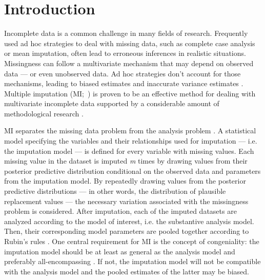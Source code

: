 \documentclass[3p,12pt,a4paper]{elsarticle}
\begin{document}
\newpage
\tableofcontents
\newpage
\section{Introduction}
Incomplete data is a common challenge in many fields of research. Frequently used ad hoc strategies to deal with missing data, such as complete case analysis or mean imputation, often lead to erroneous inferences in realistic situations. Missingness can follow a multivariate mechanism that may depend on observed data --- or even unobserved data. Ad hoc strategies don't account for those mechanisms, leading to biased estimates and inaccurate variance estimates \citep{buurenFlexibleImputationMissing2018, kang2013, enders2017, austin2021, little2002}. Multiple imputation (MI;~) is proven to be an effective method for dealing with multivariate incomplete data supported by a considerable amount of methodological research \citep{mistlerComparisonJointModel2017, buurenFlexibleImputationMissing2018, enders2017, burgette2010, austin2021, audigier2018, vanbuuren2007, grund2021, hughes2014, little2002}.

MI separates the missing data problem from the analysis problem \citep{mistlerComparisonJointModel2017, buurenFlexibleImputationMissing2018, enders2017, burgette2010, austin2021, audigier2018, vanbuuren2007, grund2021, hughes2014, little2002, carpenter2013, bartlett2015}. A statistical model specifying the variables and their relationships used for imputation --- i.e. the imputation model --- is defined for every variable with missing values. Each missing value in the dataset is imputed \textit{m} times by drawing values from their posterior predictive distribution conditional on the observed data and parameters from the imputation model. By repeatedly drawing values from the posterior predictive distributions --- in other words, the distribution of plausible replacement values --- the necessary variation associated with the missingness problem is considered. After imputation, each of the imputed datasets are analyzed according to the model of interest, i.e. the substantive analysis model. Then, their corresponding model parameters are pooled together according to Rubin's rules \citep{rubin1987}. One central requirement for MI is the concept of congeniality: the imputation model should be at least as general as the analysis model and preferably all-encompassing \citep{grund2018, enders2018, meng1994multiple, bartlett2015, grund2016, little2002}. If not, the imputation model will not be compatible with the analysis model and the pooled estimates of the latter may be biased. 
\end{document}
